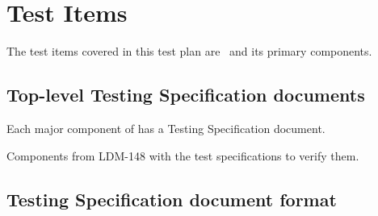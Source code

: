 \section{Test Items}

The test items covered in this test plan are \product \ and its
primary components.

\subsection{Top-level Testing Specification documents}

Each major component of \product has a Testing Specification document. 

\begin{table}
	\caption{Components from LDM-148 with the test specifications to verify them. \label{tab:testspecs}}
	
\end{table}

\subsection{Testing Specification document format}



